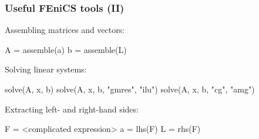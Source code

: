 \begin{frame}[fragile]
  \frametitle{Useful FEniCS tools (II)}

  \linespread{1.0}

  Assembling matrices and vectors:
  \vspace{-0.5cm}
  \begin{python}
A = assemble(a)
b = assemble(L)
  \end{python}

  \smallskip

  Solving linear systems:
  \vspace{-0.5cm}
  \begin{python}
solve(A, x, b)
solve(A, x, b, "gmres", "ilu")
solve(A, x, b, "cg", "amg")
  \end{python}

  \smallskip

  Extracting left- and right-hand sides:
  \vspace{-0.5cm}
  \begin{python}
F = <complicated expression>
a = lhs(F)
L = rhs(F)
  \end{python}

\end{frame}
